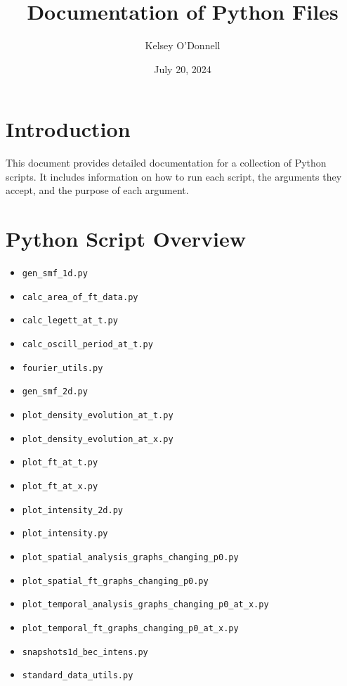 \documentclass{article}
\title{Documentation of Python Files}
\author{Kelsey O'Donnell}
\date{July 20, 2024}
\begin{document}
\maketitle

\tableofcontents

\newpage

\section{Introduction}
This document provides detailed documentation for a collection of Python scripts. It includes information on how to run each script, the arguments they accept, and the purpose of each argument.

\section{Python Script Overview}
\begin{itemize}
    \item \texttt{gen\_smf\_1d.py}
    \item \texttt{calc\_area\_of\_ft\_data.py}
    \item \texttt{calc\_legett\_at\_t.py}
    \item \texttt{calc\_oscill\_period\_at\_t.py}
    \item \texttt{fourier\_utils.py}
    \item \texttt{gen\_smf\_2d.py}
    \item \texttt{plot\_density\_evolution\_at\_t.py}
    \item \texttt{plot\_density\_evolution\_at\_x.py}
    \item \texttt{plot\_ft\_at\_t.py}
    \item \texttt{plot\_ft\_at\_x.py}
    \item \texttt{plot\_intensity\_2d.py}
    \item \texttt{plot\_intensity.py}
    \item \texttt{plot\_spatial\_analysis\_graphs\_changing\_p0.py}
    \item \texttt{plot\_spatial\_ft\_graphs\_changing\_p0.py}
    \item \texttt{plot\_temporal\_analysis\_graphs\_changing\_p0\_at\_x.py}
    \item \texttt{plot\_temporal\_ft\_graphs\_changing\_p0\_at\_x.py}
    \item \texttt{snapshots1d\_bec\_intens.py}
    \item \texttt{standard\_data\_utils.py}
\end{itemize}
\end{document}
